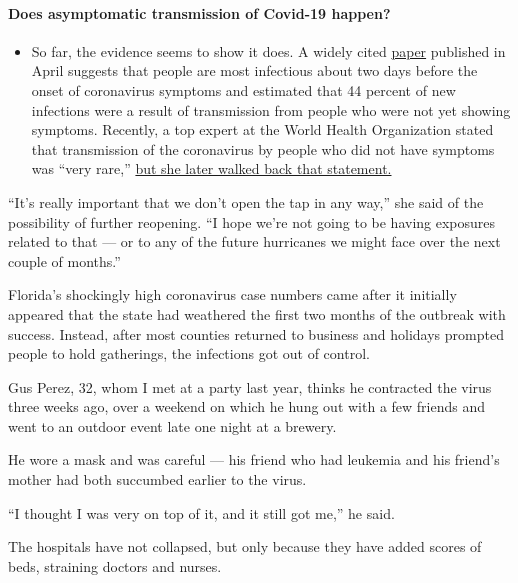 \begin{itemize}
{  \paragraph{Does asymptomatic transmission of Covid-19
  happen?}\label{does-asymptomatic-transmission-of-covid-19-happen}}

  \begin{itemize}
  \tightlist
  \item
    So far, the evidence seems to show it does. A widely cited
    \href{https://www.nature.com/articles/s41591-020-0869-5}{paper}
    published in April suggests that people are most infectious about
    two days before the onset of coronavirus symptoms and estimated that
    44 percent of new infections were a result of transmission from
    people who were not yet showing symptoms. Recently, a top expert at
    the World Health Organization stated that transmission of the
    coronavirus by people who did not have symptoms was ``very rare,''
    \href{https://www.nytimes.com/2020/06/09/world/coronavirus-updates.html?action=click\&pgtype=Article\&state=default\&region=MAIN_CONTENT_3\&context=storylines_faq\#link-1f302e21}{but
    she later walked back that statement.}
  \end{itemize}
\end{itemize}

``It's really important that we don't open the tap in any way,'' she
said of the possibility of further reopening. ``I hope we're not going
to be having exposures related to that --- or to any of the future
hurricanes we might face over the next couple of months.''

Florida's shockingly high coronavirus case numbers came after it
initially appeared that the state had weathered the first two months of
the outbreak with success. Instead, after most counties returned to
business and holidays prompted people to hold gatherings, the infections
got out of control.

Gus Perez, 32, whom I met at a party last year, thinks he contracted the
virus three weeks ago, over a weekend on which he hung out with a few
friends and went to an outdoor event late one night at a brewery.

He wore a mask and was careful --- his friend who had leukemia and his
friend's mother had both succumbed earlier to the virus.

``I thought I was very on top of it, and it still got me,'' he said.

The hospitals have not collapsed, but only because they have added
scores of beds, straining doctors and nurses.

